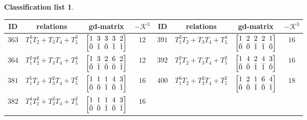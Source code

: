 \documentclass[10pt,a4paper]{amsart}
\theoremstyle{definition}
\newtheorem{class-list}[thm]{Classification list}
\numberwithin{equation}{section}
\begin{document}
\begin{class-list}
\begin{table}[h!]\centering\setlength{\tabcolsep}{3.5pt}
\renewcommand{\arraystretch}{1.3}\small\tabulinesep=1mm
\begin{tabu}{c|c|c|c||c|c|c|c}
\hline
ID&relations&gd-matrix&$-\mathcal{K}^3$&ID&relations&gd-matrix&$-\mathcal{K}^3$
\\
\hline
${363}$&${T_{1}^{3}T_{2}+T_{3}T_{4}+T_{5}^{3}}$
&$\arraycolsep=1mm\begin{bmatrix}{1} & {3} & {3} & {3} & {2} \\ {\bar{0}} & {\bar{1}} & {\bar{0}} & {\bar{1}} & {\bar{1}}\end{bmatrix}$&${12}$
&${391}$&${T_{1}^{2}T_{2}+T_{3}T_{4}+T_{5}^{4}}$
&$\arraycolsep=1mm\begin{bmatrix}{1} & {2} & {2} & {2} & {1} \\ {\bar{0}} & {\bar{0}} & {\bar{1}} & {\bar{1}} & {\bar{0}}\end{bmatrix}$&${16}$
\\
\hline
${364}$&${T_{1}^{2}T_{2}^{2}+T_{3}T_{4}+T_{5}^{4}}$
&$\arraycolsep=1mm\begin{bmatrix}{1} & {3} & {2} & {6} & {2} \\ {\bar{0}} & {\bar{1}} & {\bar{0}} & {\bar{0}} & {\bar{1}}\end{bmatrix}$&${12}$
&${392}$&${T_{1}^{2}T_{2}+T_{3}T_{4}+T_{5}^{2}}$
&$\arraycolsep=1mm\begin{bmatrix}{1} & {4} & {2} & {4} & {3} \\ {\bar{0}} & {\bar{0}} & {\bar{1}} & {\bar{1}} & {\bar{0}}\end{bmatrix}$&${16}$
\\
\hline
${381}$&${T_{1}^{5}T_{2}+T_{3}^{2}T_{4}+T_{5}^{2}}$
&$\arraycolsep=1mm\begin{bmatrix}{1} & {1} & {1} & {4} & {3} \\ {\bar{0}} & {\bar{0}} & {\bar{1}} & {\bar{0}} & {\bar{1}}\end{bmatrix}$&${16}$
&${400}$&${T_{1}^{6}T_{2}+T_{3}^{2}T_{4}+T_{5}^{2}}$
&$\arraycolsep=1mm\begin{bmatrix}{1} & {2} & {1} & {6} & {4} \\ {\bar{0}} & {\bar{0}} & {\bar{1}} & {\bar{0}} & {\bar{1}}\end{bmatrix}$&${18}$
\\
\hline
${382}$&${T_{1}^{4}T_{2}^{2}+T_{3}^{2}T_{4}+T_{5}^{2}}$
&$\arraycolsep=1mm\begin{bmatrix}{1} & {1} & {1} & {4} & {3} \\ {\bar{0}} & {\bar{0}} & {\bar{1}} & {\bar{0}} & {\bar{1}}\end{bmatrix}$&${16}$

\end{tabu}
\end{table}
\end{class-list}
\end{document}
